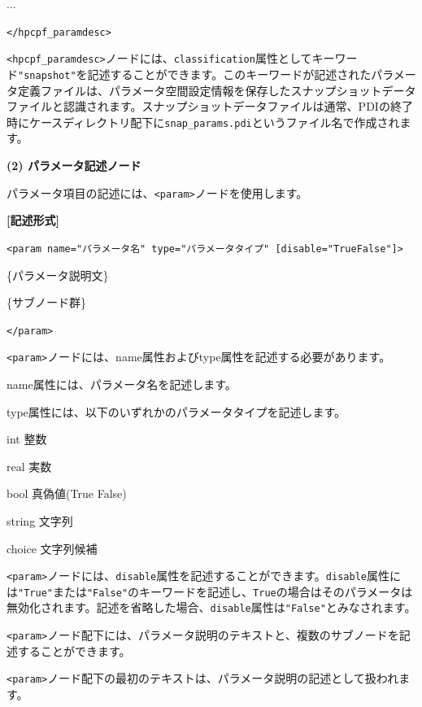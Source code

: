 \documentclass[a4paper,11pt]{jarticle}
\begin{document}
{...

\texttt{</hpcpf\_paramdesc>}

\vspace{8pt}
\leftskip=0pt
\texttt{<hpcpf\_paramdesc>}ノードには、{\tt classification}属性としてキーワード\texttt{"snapshot"}を記述することができます。このキーワードが記述されたパラメータ定義ファイルは、パラメータ空間設定情報を保存したスナップショットデータファイルと認識されます。スナップショットデータファイルは通常、PDIの終了時にケースディレクトリ配下に{\tt snap\_params.pdi}というファイル名で作成されます。

\vspace{12pt}
\textbf{(2) パラメータ記述ノード}

パラメータ項目の記述には、\texttt{<param>}ノードを使用します。

\vspace{8pt}
\leftskip=12pt
\textbf{[記述形式]}

\leftskip=42pt
\texttt{<param name="パラメータ名"  type="パラメータタイプ" 
 [disable="True\textbar{}False"]>}    

\parindent=14pt
\{パラメータ説明文\}

\{サブノード群\}

\parindent=0pt
\texttt{</param>}

\vspace{8pt}
\leftskip=0pt
\texttt{<param>}ノードには、name属性およびtype属性を記述する必要があります。

name属性には、パラメータ名を記述します。

type属性には、以下のいずれかのパラメータタイプを記述します。

\parindent=18pt
int 整数

real 実数

bool 真偽値(True \textbar{} False)

string 文字列

choice 文字列候補

\parindent=0pt
\texttt{<param>}ノードには、{\tt disable}属性を記述することができます。{\tt disable}属性には\texttt{"True"}または\texttt{"False"}のキーワードを記述し、{\tt True}の場合はそのパラメータは無効化されます。記述を省略した場合、{\tt disable}属性は\texttt{"False"}とみなされます。

\vspace{12pt}
\texttt{<param>}ノード配下には、パラメータ説明のテキストと、複数のサブノードを記述することができます。

\texttt{<param>}ノード配下の最初のテキストは、パラメータ説明の記述として扱われます。

}
\end{document}
